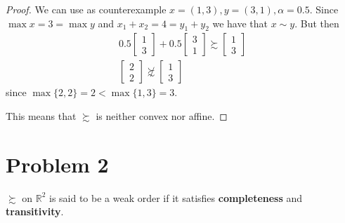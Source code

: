 \documentclass[12pt]{extarticle}
\numberwithin{table}{section}
\numberwithin{figure}{section}
\numberwithin{equation}{section}
\begin{document}
\begin{enumerate}[label=\alph*.)]
          \begin{proof}
              We can use as counterexample $x = (1, 3), y = (3, 1), \alpha = 0.5$.
              Since $\max x = 3 = \max y$ and $x_1 + x_2 = 4 = y_1 + y_2$ we have that $x \sim y$.
              But then
              \begin{gather}
                  0.5 \begin{bmatrix}1 \\ 3\end{bmatrix} + 0.5 \begin{bmatrix}3 \\ 1\end{bmatrix} \succsim \begin{bmatrix}1 \\ 3\end{bmatrix} \\
                  \begin{bmatrix}2 \\ 2\end{bmatrix} \not \succsim \begin{bmatrix}1 \\ 3\end{bmatrix}
              \end{gather}
              since $\max\{2,2\} = 2 < \max\{ 1, 3 \} = 3$.

              This means that $\succsim$ is neither convex nor affine.
          \end{proof}
\end{enumerate}

\section*{Problem 2}

$\succsim$ on $\mathbb{R}^2$ is said to be a weak order if it satisfies \textbf{completeness} and \textbf{transitivity}.
\end{document}
